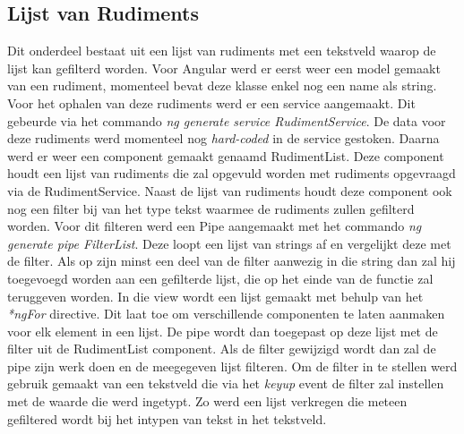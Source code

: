  \subsection{Lijst van Rudiments}
 Dit onderdeel bestaat uit een lijst van rudiments met een tekstveld waarop de lijst kan gefilterd worden. Voor Angular werd er eerst weer een model gemaakt van een rudiment, momenteel bevat deze klasse enkel nog een name als string. Voor het ophalen van deze rudiments werd er een service aangemaakt. Dit gebeurde via het commando \textit{ng generate service RudimentService}. De data voor deze rudiments werd momenteel nog \textit{hard-coded} in de service gestoken. Daarna werd er weer een component gemaakt genaamd RudimentList. Deze component houdt een lijst van rudiments die zal opgevuld worden met rudiments opgevraagd via de RudimentService. Naast de lijst van rudiments houdt deze component ook nog een filter bij van het type tekst waarmee de rudiments zullen gefilterd worden. Voor dit filteren werd een Pipe aangemaakt met het commando \textit{ng generate pipe FilterList}. Deze loopt een lijst van strings af en vergelijkt deze met de filter. Als op zijn minst een deel van de filter aanwezig in die string dan zal hij toegevoegd worden aan een gefilterde lijst, die op het einde van de functie zal teruggeven worden. In die view wordt een lijst gemaakt met behulp van het \textit{*ngFor} directive. Dit laat toe om verschillende componenten te laten aanmaken voor elk element in een lijst. De pipe wordt dan toegepast op deze lijst met de filter uit de RudimentList component. Als de filter gewijzigd wordt dan zal de pipe zijn werk doen en de meegegeven lijst filteren. Om de filter in te stellen werd gebruik gemaakt van een tekstveld die via het \textit{keyup} event de filter zal instellen met de waarde die werd ingetypt. Zo werd een lijst verkregen die meteen gefiltered wordt bij het intypen van tekst in het tekstveld.

